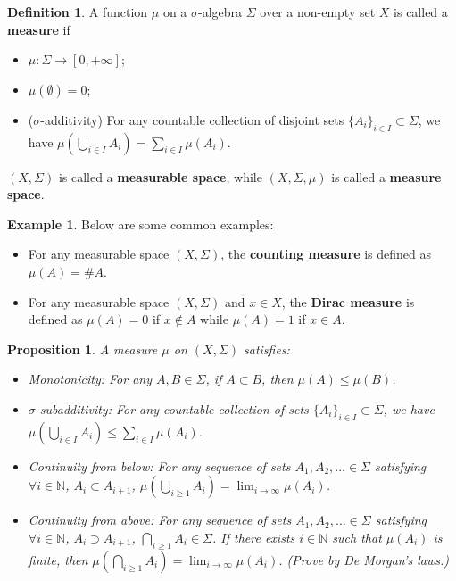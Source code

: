 \documentclass[openany]{book}
\newtheorem{proposition}{Proposition}[chapter]
\theoremstyle{definition}
\newtheorem{definition}{Definition}[chapter]
\newtheorem{example}{Example}[chapter]
\theoremstyle{remark}
\begin{document}
\begin{definition}
    A function $\mu$ on a $\sigma$-algebra $\Sigma$ over a non-empty set $X$ is called a \textbf{measure} if
    \begin{itemize}
        \item $\mu:\Sigma\rightarrow[0,+\infty]$;
        \item $\mu(\emptyset)=0$;
        \item ($\sigma$-additivity) For any countable collection of disjoint sets $\{A_i\}_{i\in I}\subset\Sigma$, we have $\mu\left(\bigcup_{i\in I}A_i\right)=\sum_{i\in I}\mu(A_i)$.
    \end{itemize}
    $(X,\Sigma)$ is called a \textbf{measurable space}, while $(X,\Sigma,\mu)$ is called a \textbf{measure space}.
\end{definition}
\begin{example}
    Below are some common examples:
    \begin{itemize}
        \item For any measurable space $(X,\Sigma)$, the \textbf{counting measure} is defined as $\mu(A)=\#A$.
        \item For any measurable space $(X,\Sigma)$ and $x\in X$, the \textbf{Dirac measure} is defined as $\mu(A)=0$ if $x\not\in A$ while $\mu(A)=1$ if $x\in A$.
    \end{itemize}
\end{example}
\begin{proposition}
    A measure $\mu$ on $(X,\Sigma)$ satisfies:
    \begin{itemize}
        \item Monotonicity: For any $A,B\in\Sigma$, if $A\subset B$, then $\mu(A)\le\mu(B)$.
        \item $\sigma$-subadditivity: For any countable collection of sets $\{A_i\}_{i\in I}\subset\Sigma$, we have $\mu\left(\bigcup_{i\in I}A_i\right)\le\sum_{i\in I}\mu(A_i)$.
        \item Continuity from below: For any sequence of sets $A_1,A_2,\ldots\in\Sigma$ satisfying $\forall i\in \mathbb{N}$, $A_i\subset A_{i+1}$, $\mu\left(\bigcup_{i\ge1}A_i\right)=\lim_{i\rightarrow\infty}\mu(A_i)$.
        \item Continuity from above: For any sequence of sets $A_1,A_2,\ldots\in\Sigma$ satisfying $\forall i\in \mathbb{N}$, $A_i\supset A_{i+1}$, $\bigcap_{i\ge1}A_i\in\Sigma$. If there exists $i\in \mathbb{N}$ such that $\mu(A_i)$ is finite, then $\mu\left(\bigcap_{i\ge1}A_i\right)=\lim_{i\rightarrow\infty}\mu(A_i)$. (Prove by De Morgan's laws.)
    \end{itemize}
\end{proposition}
\end{document}

